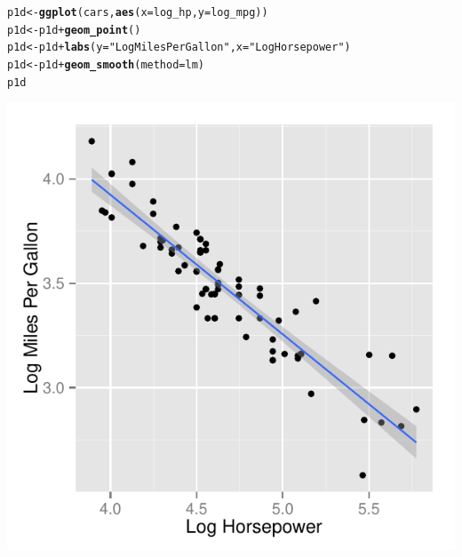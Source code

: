 \documentclass{article}\usepackage[]{graphicx}\usepackage[]{color}
\makeatletter
\def\maxwidth{ %
  \ifdim\Gin@nat@width>\linewidth
    \linewidth
  \else
    \Gin@nat@width
  \fi
}
\newcommand{\hlstr}[1]{\textcolor[rgb]{0.192,0.494,0.8}{#1}}%
\newcommand{\hlopt}[1]{\textcolor[rgb]{0,0,0}{#1}}%
\newcommand{\hlstd}[1]{\textcolor[rgb]{0.345,0.345,0.345}{#1}}%
\newcommand{\hlkwb}[1]{\textcolor[rgb]{0.69,0.353,0.396}{#1}}%
\newcommand{\hlkwc}[1]{\textcolor[rgb]{0.333,0.667,0.333}{#1}}%
\newcommand{\hlkwd}[1]{\textcolor[rgb]{0.737,0.353,0.396}{\textbf{#1}}}%
\newenvironment{kframe}{%
 \def\at@end@of@kframe{}%
 \ifinner\ifhmode%
  \def\at@end@of@kframe{\end{minipage}}%
  \begin{minipage}{\columnwidth}%
 \fi\fi%
 \def\FrameCommand##1{\hskip\@totalleftmargin \hskip-\fboxsep
 \colorbox{shadecolor}{##1}\hskip-\fboxsep
     \hskip-\linewidth \hskip-\@totalleftmargin \hskip\columnwidth}%
 \MakeFramed {\advance\hsize-\width
   \@totalleftmargin\z@ \linewidth\hsize
   \@setminipage}}%
 {\par\unskip\endMakeFramed%
 \at@end@of@kframe}
\newenvironment{knitrout}{}{} %
\makeatother
\begin{document}
\begin{knitrout}
\color{fgcolor}\begin{kframe}
\begin{alltt}
\hlstd{p1d} \hlkwb{<-} \hlkwd{ggplot}\hlstd{(cars,} \hlkwd{aes}\hlstd{(}\hlkwc{x} \hlstd{= log_hp,} \hlkwc{y} \hlstd{= log_mpg))}
\hlstd{p1d} \hlkwb{<-} \hlstd{p1d} \hlopt{+} \hlkwd{geom_point}\hlstd{()}
\hlstd{p1d} \hlkwb{<-} \hlstd{p1d} \hlopt{+} \hlkwd{labs}\hlstd{(}\hlkwc{y} \hlstd{=} \hlstr{"Log Miles Per Gallon"}\hlstd{,} \hlkwc{x} \hlstd{=} \hlstr{"Log Horsepower"}\hlstd{)}
\hlstd{p1d} \hlkwb{<-} \hlstd{p1d} \hlopt{+} \hlkwd{geom_smooth}\hlstd{(}\hlkwc{method} \hlstd{= lm)}
\hlstd{p1d}
\end{alltt}
\end{kframe}

{\centering \includegraphics[width=\maxwidth]{figure/1a3-1} 

}



\end{knitrout}
\end{document}

